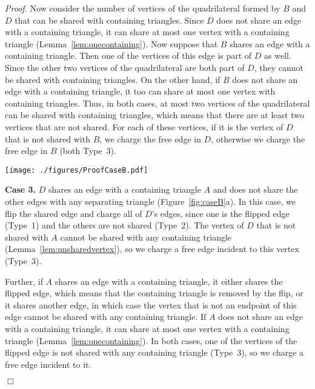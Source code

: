 \pdfoutput=1 \documentclass[12pt]{elsarticle}
\newenvironment{proof}{\emph{Proof.}}{\hfill $\Box$ \medskip\\}
\begin{document}
\begin{proof}
  Now consider the number of vertices of the quadrilateral formed by $B$ and $D$ that can be shared with containing triangles. Since $D$ does not share an edge with a containing triangle, it can share at most one vertex with a containing triangle (Lemma~\ref{lem:onecontaining}). Now suppose that $B$ shares an edge with a containing triangle. Then one of the vertices of this edge is part of $D$ as well. Since the other two vertices of the quadrilateral are both part of $D$, they cannot be shared with containing triangles. On the other hand, if $B$ does not share an edge with a containing triangle, it too can share at most one vertex with containing triangles. Thus, in both cases, at most two vertices of the quadrilateral can be shared with containing triangles, which means that there are at least two vertices that are not shared. For each of these vertices, if it is the vertex of $D$ that is not shared with $B$, we charge the free edge in $D$, otherwise we charge the free edge in $B$ (both Type~3).

 \begin{figure*}[ht]
  \centering
  \texttt{[image: ./figures/ProofCaseB.pdf]}
  \caption{The edges that are charged if the deepest separating triangle shares an edge with a containing triangle.}
  \label{fig:caseB}
  \vspace{1em}
 \end{figure*}

 \smallskip
  \textbf{Case 3.} $D$ shares an edge with a containing triangle $A$ and does not share the other edges with any separating triangle (Figure~\ref{fig:caseB}a). In this case, we flip the shared edge and charge all of $D$'s edges, since one is the flipped edge (Type~1) and the others are not shared (Type~2). The vertex of $D$ that is not shared with $A$ cannot be shared with any containing triangle (Lemma~\ref{lem:unsharedvertex}), so we charge a free edge incident to this vertex (Type~3).

  Further, if $A$ shares an edge with a containing triangle, it either shares the flipped edge, which means that the containing triangle is removed by the flip, or it shares another edge, in which case the vertex that is not an endpoint of this edge cannot be shared with any containing triangle. If $A$ does not share an edge with a containing triangle, it can share at most one vertex with a containing triangle (Lemma~\ref{lem:onecontaining}). In both cases, one of the vertices of the flipped edge is not shared with any containing triangle (Type~3), so we charge a free edge incident to it.


\end{proof}
\end{document}
